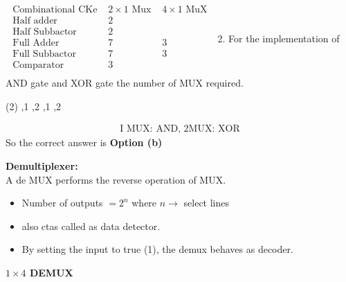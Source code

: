 $\begin{array}{c|c|c}
	\text { Combinational CKe } & 2 \times 1 \text { Mux } & 4 \times 1 \text { MuX } \\
	\hline \text { Half adder } & 2 & \\
	\hline \text { Half Subbactor } & 2 & \\
	\hline \text { Full Adder } & 7 & 3\\
	\hline \text { Full Subbactor } & 7 & 3\\
		\hline \text { Comparator } & 3 &  \\
\end{array}$
2. \quad For the implementation of AND gate and XOR gate the number of MUX required.
 \begin{tasks}(2)
	,1
	,2
	,1
	,2
\end{tasks}
\begin{answer}
	\begin{align*}
	\text { I MUX: AND, 2MUX: XOR }
	\end{align*}
	So the correct answer is \textbf{Option (b)}
\end{answer}
\textbf{Demultiplexer:}\\
A de MUX performs the reverse operation of MUX.\\
\begin{itemize}
	\item Number of outputs $=2^{n}$ where $n \rightarrow$ select lines
	\item  also ctas called as data detector.
	\item By setting the input to true (1), the demux behaves as decoder.
\end{itemize}
\textbf{$1 \times 4$ DEMUX}\\









